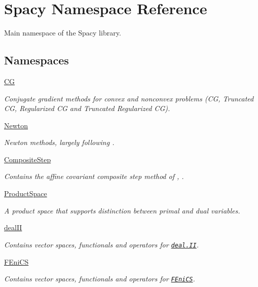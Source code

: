 \hypertarget{namespaceSpacy}{\section{Spacy Namespace Reference}
\label{namespaceSpacy}
}


Main namespace of the Spacy library.  


\subsection*{Namespaces}
\begin{DoxyCompactItemize}
\item 
\hyperlink{namespaceSpacy_1_1CG}{C\-G}
\begin{DoxyCompactList}\small\item\em Conjugate gradient methods for convex and nonconvex problems (C\-G, Truncated C\-G, Regularized C\-G and Truncated Regularized C\-G). \end{DoxyCompactList}\item 
\hyperlink{namespaceSpacy_1_1Newton}{Newton}
\begin{DoxyCompactList}\small\item\em Newton methods, largely following \cite{Deuflhard2004}. \end{DoxyCompactList}\item 
\hyperlink{namespaceSpacy_1_1CompositeStep}{Composite\-Step}
\begin{DoxyCompactList}\small\item\em Contains the affine covariant composite step method of \cite{Lubkoll2015}, \cite{Lubkoll2015a}. \end{DoxyCompactList}\item 
\hyperlink{namespaceSpacy_1_1ProductSpace}{Product\-Space}
\begin{DoxyCompactList}\small\item\em A product space that supports distinction between primal and dual variables. \end{DoxyCompactList}\item 
\hyperlink{namespaceSpacy_1_1dealII}{deal\-I\-I}
\begin{DoxyCompactList}\small\item\em Contains vector spaces, functionals and operators for \href{www.deal.org}{\tt deal.\-I\-I}. \end{DoxyCompactList}\item 
\hyperlink{namespaceSpacy_1_1FEniCS}{F\-Eni\-C\-S}
\begin{DoxyCompactList}\small\item\em Contains vector spaces, functionals and operators for \href{www.fenicsproject.org}{\tt F\-Eni\-C\-S}. \end{DoxyCompactList}\item 

\end{DoxyCompactItemize}

